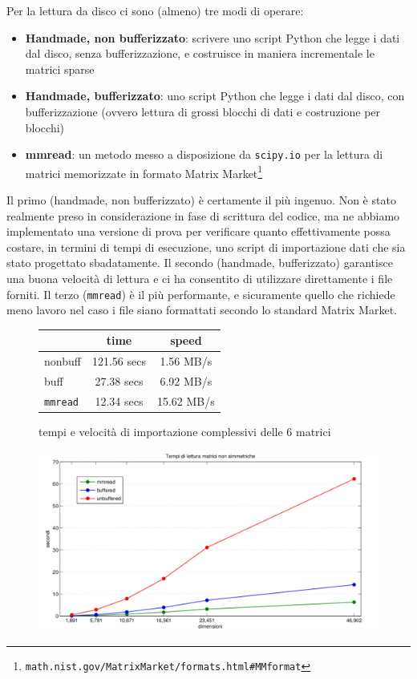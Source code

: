 \documentclass[11pt,a4paper]{scrartcl}
\begin{document}
Per la lettura da disco ci sono (almeno) tre modi di operare:
\begin{itemize}
\item \textbf{Handmade, non bufferizzato}: scrivere uno script Python che legge i dati dal disco, senza bufferizzazione, e costruisce in maniera incrementale le matrici sparse
\item \textbf{Handmade, bufferizzato}: uno script Python che legge i dati dal disco, con bufferizzazione (ovvero lettura di grossi blocchi di dati e costruzione per blocchi)
\item \textbf{mmread}: un metodo messo a disposizione da \texttt{scipy.io} per la lettura di matrici memorizzate in formato Matrix Market\footnote{\texttt{math.nist.gov/MatrixMarket/formats.html\#MMformat}}
\end{itemize}

Il primo (handmade, non bufferizzato) è certamente il più ingenuo. Non è stato realmente preso in considerazione in fase di scrittura del codice, ma ne abbiamo implementato una versione di prova per verificare quanto effettivamente possa costare, in termini di tempi di esecuzione, uno script di importazione dati che sia stato progettato sbadatamente. Il secondo (handmade, bufferizzato) garantisce una buona velocità di lettura e ci ha consentito di utilizzare direttamente i file forniti. Il terzo (\texttt{mmread}) è il più performante, e sicuramente quello che richiede meno lavoro nel caso i file siano formattati secondo lo standard Matrix Market.

\begin{figure}[!ht]
\centering
\begin{tabular}{l|cc}
\toprule
& time & speed \\
\midrule
nonbuff & 121.56 secs & 1.56 MB/s \\
buff & 27.38 secs & 6.92 MB/s \\
\texttt{mmread} & 12.34 secs & 15.62 MB/s \\
\bottomrule
\end{tabular}
\caption{tempi e velocità di importazione complessivi delle 6 matrici}
\end{figure}

\begin{figure}[!ht]
\centering
\includegraphics[scale=0.51]{images/lettura} 
\end{figure}
\end{document}
